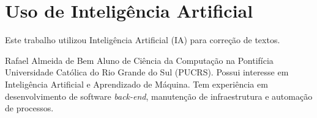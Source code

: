 \documentclass[journal]{IEEEtran}
\begin{document}



\section*{Uso de Inteligência Artificial}
\noindent%
Este trabalho utilizou Inteligência Artificial (IA) para correção de textos.

\begin{IEEEbiographynophoto}{Rafael Almeida de Bem}
Aluno de Ciência da Computação na Pontifícia Universidade Católica do Rio Grande do Sul (PUCRS).
Possui interesse em Inteligência Artificial e Aprendizado de Máquina.
Tem experiência em desenvolvimento de software \textit{back-end}, manutenção de infraestrutura e automação de processos.
\end{IEEEbiographynophoto}
\end{document}
